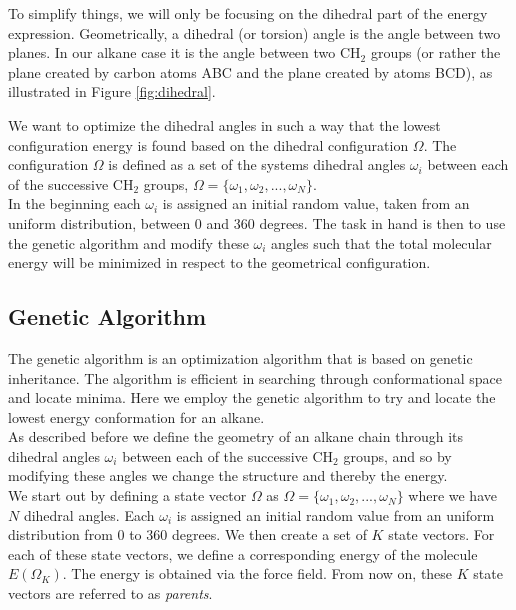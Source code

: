 \documentclass{article}
\begin{document}
To simplify things, we will only be focusing on the dihedral part of the energy expression.
Geometrically, a dihedral (or torsion) angle is the angle between two planes. In our alkane case it is the angle between two CH$_2$ groups (or rather the plane created by carbon atoms ABC and the plane created by atoms BCD), as illustrated in Figure \ref{fig:dihedral}.

We want to optimize the dihedral angles in such a way that the lowest configuration energy is found based on the dihedral configuration $\Omega$.
The configuration $\Omega$ is defined as a set of the systems dihedral angles $\omega_i$ between each of the successive CH$_2$ groups, $\Omega = \{ \omega_1, \omega_2, ... , \omega_N \}$.\\

In the beginning each $\omega_i$ is assigned an initial random value, taken from an uniform distribution, between 0 and 360 degrees.
The task in hand is then to use the genetic algorithm and modify these $\omega_i$ angles such that the total molecular energy will be minimized in respect to the geometrical configuration.

\subsection{Genetic Algorithm}

The genetic algorithm is an optimization algorithm that is based on genetic inheritance.
The algorithm is efficient in searching through conformational space and locate minima.
Here we employ the genetic algorithm to try and locate the lowest energy conformation for an alkane.\\

As described before we define the geometry of an alkane chain through its dihedral angles $\omega_i$ between each of the successive CH$_2$ groups, and so by modifying these angles we change the structure and thereby the energy.\\

We start out by defining a state vector $\Omega$ as $\Omega = \{ \omega_1, \omega_2, ... , \omega_N \}$ where we have $N$ dihedral angles.
Each $\omega_i$ is assigned an initial random value from an uniform distribution from 0 to 360 degrees.
%
% 
%
We then create a set of $K$ state vectors.
For each of these state vectors, we define a corresponding energy of the molecule $E(\Omega_K)$.
The energy is obtained via the force field.
From now on, these $K$ state vectors are referred to as \emph{parents}.\\
\end{document}
